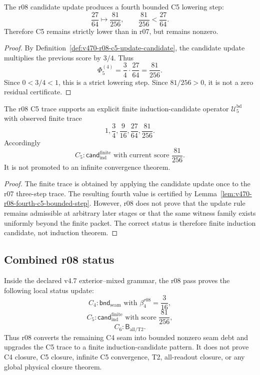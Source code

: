\begin{lemma}
\label{lem:v470-r08-fourth-c5-bounded-step}
The r08 candidate update produces a fourth bounded C5 lowering step:
\[
\frac{27}{64}\longmapsto \frac{81}{256},
\qquad
\frac{81}{256}<\frac{27}{64}.
\]
Therefore C5 remains strictly lower than in r07, but remains nonzero.
\end{lemma}

\begin{proof}
By Definition~\ref{def:v470-r08-c5-update-candidate}, the candidate update
multiplies the previous score by \(3/4\).  Thus
\[
\Phi_5^{(4)}=\frac34\cdot\frac{27}{64}=\frac{81}{256}.
\]
Since \(0<3/4<1\), this is a strict lowering step.  Since
\(81/256>0\), it is not a zero residual certificate.
\end{proof}

\begin{proposition}
\label{prop:v470-r08-finite-induction-candidate-status}
The r08 C5 trace supports an explicit finite induction-candidate operator
\(\mathcal U_5^{\mathrm{bd}}\) with observed finite trace
\[
1,\frac34,\frac9{16},\frac{27}{64},\frac{81}{256}.
\]
Accordingly
\[
C_5:
\mathsf{cand}_{\mathrm{ind}}^{\mathrm{finite}}
\text{ with current score }\frac{81}{256}.
\]
It is not promoted to an infinite convergence theorem.
\end{proposition}

\begin{proof}
The finite trace is obtained by applying the candidate update once to the r07
three-step trace.  The resulting fourth value is certified by
Lemma~\ref{lem:v470-r08-fourth-c5-bounded-step}.  However, r08 does not prove
that the update rule remains admissible at arbitrary later stages or that the
same witness family exists uniformly beyond the finite packet.  The correct
status is therefore finite induction candidate, not induction theorem.
\end{proof}

\subsection{Combined r08 status}
\label{subsec:v470-r08-combined-status}

\begin{theorem}
\label{thm:v470-r08-collar-induction-candidate-theorem}
Inside the declared v4.7 exterior--mixed grammar, the r08 pass proves the
following local status update:
\[
C_4:
\mathsf{bnd}_{\mathrm{seam}}
\text{ with }\beta_4^{r08}=\frac3{16},
\]
\[
C_5:
\mathsf{cand}_{\mathrm{ind}}^{\mathrm{finite}}
\text{ with score }\frac{81}{256},
\]
\[
C_6:
\mathsf B_{\mathrm{all/T2}}.
\]
Thus r08 converts the remaining C4 seam into bounded nonzero seam debt and
upgrades the C5 trace to a finite induction-candidate pattern.  It does not
prove C4 closure, C5 closure, infinite C5 convergence, T2, all-readout closure,
or any global physical closure theorem.
\end{theorem}

